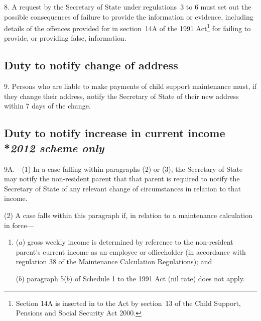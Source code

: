 \documentclass[12pt,a4paper]{article}
\begin{document}
8.  A request by the 
Secretary of State  %
under regulations~3 to 6 must set out the possible consequences of failure to provide the information or evidence, including details of the offences provided for in section~14A of the 1991 Act\footnote{Section 14A is inserted in to the Act by section~13 of the Child Support, Pensions and Social Security Act 2000.} for failing to provide, or providing false, information.


\subsection[9. Duty to notify change of address]{Duty to notify change of address}

9.  Persons who are liable to make payments of child support maintenance must, if they change their address, notify the 
Secretary of State  %
of their new address within 7 days of the change.


\subsection[9A. Duty to notify increase in current income]{Duty to notify increase in current income\\*\emph{2012 scheme only}}

9A.---(1)  In a case falling within paragraphs (2) or (3), the Secretary of State may notify the non-resident parent that that parent is required to notify the Secretary of State of any relevant change of circumstances in relation to that income.

(2) A case falls within this paragraph if, in relation to a maintenance calculation in force—
\begin{enumerate}\item[]
($a$) gross weekly income is determined by reference to the non-resident parent’s current income as an employee or officeholder (in accordance with regulation 38 of the Maintenance Calculation Regulations); and

($b$) paragraph 5($b$)  of Schedule 1 to the 1991 Act (nil rate) does not apply.
\end{enumerate}
\end{document}
